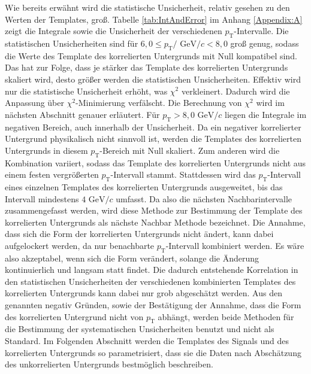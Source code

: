 Wie bereits erwähnt wird die statistische Unsicherheit, relativ gesehen zu den Werten der Templates, groß.
Tabelle \ref{tab:IntAndError} im Anhang \ref{Appendix:A} zeigt die Integrale sowie die Unsicherheit der verschiedenen $p_\text{T}$-Intervalle.
Die statistischen Unsicherheiten sind für $6,0 \leq p_\text{T}/\text{ GeV}/c < 8,0 $ groß genug, sodass die Werte des Template des korrelierten Untergrunds mit Null kompatibel sind.
Das hat zur Folge, dass je stärker das Template des korrelierten Untergrunds skaliert wird, desto größer werden die statistischen Unsicherheiten.
Effektiv wird nur die statistische Unsicherheit erhöht, was $\chi^{2}$ verkleinert.
Dadurch wird die Anpassung über $\chi^{2}$-Minimierung verfälscht.
Die Berechnung von $\chi^{2}$ wird im nächsten Abschnitt genauer erläutert.
\newline
Für $p_\text{T} > 8,0 \text{ GeV}/c$ liegen die Integrale im negativen Bereich, auch innerhalb der Unsicherheit.
Da ein negativer korrelierter Untergrund physikalisch nicht sinnvoll ist, werden die Templates des korrelierten Untergrunds in diesem $p_\text{T}$-Bereich mit Null skaliert.
\newline
Zum anderen wird die Kombination variiert, sodass das Template des korrelierten Untergrunds nicht aus einem festen vergrößerten $p_\text{T}$-Intervall stammt.
Stattdessen wird das $p_\text{T}$-Intervall eines einzelnen Templates des korrelierten Untergrunds ausgeweitet, bis das Intervall mindestens $4\text{ GeV}/c$ umfasst.
Da also die nächsten Nachbarintervalle zusammengefasst werden, wird diese Methode zur Bestimmung der Template des korrelierten Untergrunds als nächste Nachbar Methode bezeichnet.
Die Annahme, dass sich die Form der korrelierten Untergrunds nicht ändert, kann dabei aufgelockert werden, da nur benachbarte $p_\text{T}$-Intervall kombiniert werden.
Es wäre also akzeptabel, wenn sich die Form verändert, solange die Änderung kontinuierlich und langsam statt findet.
Die dadurch entstehende Korrelation in den statistischen Unsicherheiten der verschiedenen kombinierten Templates des korrelierten Untergrunds kann dabei nur grob abgeschätzt werden. 
\newline
Aus den genannten negativ Gründen, sowie der Bestätigung der Annahme, dass die Form des korrelierten Untergrund nicht von $p_\text{T}$ abhängt, werden beide Methoden für die Bestimmung der systematischen Unsicherheiten benutzt und nicht als Standard.
\newline
Im Folgenden Abschnitt werden die Templates des Signals und des korrelierten Untergrunds so parametrisiert, dass sie die Daten nach Abschätzung des unkorrelierten Untergrunds bestmöglich beschreiben.